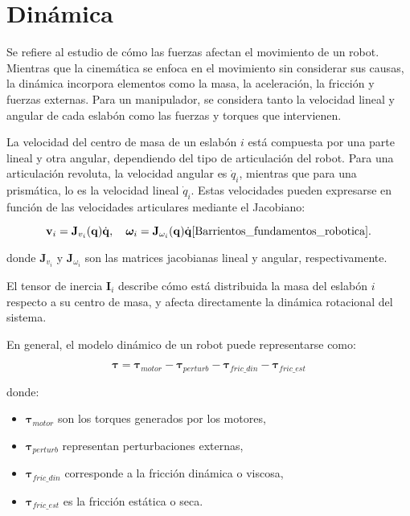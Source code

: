\section{Dinámica} \label{sec:dinamica}

Se refiere al estudio de cómo las fuerzas afectan el movimiento de un robot. Mientras que la cinemática se enfoca en el movimiento sin considerar sus causas, la dinámica incorpora elementos como la masa, la aceleración, la fricción y fuerzas externas. Para un manipulador, se considera tanto la velocidad lineal y angular de cada eslabón como las fuerzas y torques que intervienen\cite{Barrientos_fundamentos_robotica}.

La velocidad del centro de masa de un eslabón \(i\) está compuesta por una parte lineal y otra angular, dependiendo del tipo de articulación del robot. Para una articulación revoluta, la velocidad angular es \(\dot{q}_i\), mientras que para una prismática, lo es la velocidad lineal \(\dot{q}_i\). Estas velocidades pueden expresarse en función de las velocidades articulares mediante el Jacobiano:

\begin{equation}
	\mathbf{v}_i = \mathbf{J}_{v_i}(\mathbf{q}) \dot{\mathbf{q}}, \quad
	\boldsymbol{\omega}_i = \mathbf{J}_{\omega_i}(\mathbf{q}) \dot{\mathbf{q}}\cite{Barrientos_fundamentos_robotica}.
\end{equation}

donde \(\mathbf{J}_{v_i}\) y \(\mathbf{J}_{\omega_i}\) son las matrices jacobianas lineal y angular, respectivamente.

El tensor de inercia \(\mathbf{I}_i\) describe cómo está distribuida la masa del eslabón \(i\) respecto a su centro de masa, y afecta directamente la dinámica rotacional del sistema.

En general, el modelo dinámico de un robot puede representarse como:

\begin{equation}
	\boldsymbol{\tau} = \boldsymbol{\tau}_{motor} - \boldsymbol{\tau}_{perturb} - \boldsymbol{\tau}_{fric\_din} - \boldsymbol{\tau}_{fric\_est}
\end{equation}

donde:
\begin{itemize}
	\item \(\boldsymbol{\tau}_{motor}\) son los torques generados por los motores,
	\item \(\boldsymbol{\tau}_{perturb}\) representan perturbaciones externas,
	\item \(\boldsymbol{\tau}_{fric\_din}\) corresponde a la fricción dinámica o viscosa,
	\item \(\boldsymbol{\tau}_{fric\_est}\) es la fricción estática o seca.
\end{itemize}


